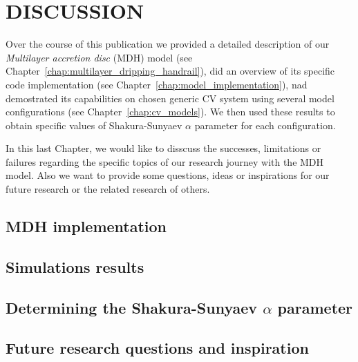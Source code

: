 \chapter{DISCUSSION}
\thispagestyle{empty}


    Over the course of this publication we provided a detailed description of our \emph{Multilayer accretion disc} (MDH) model (see Chapter~\ref{chap:multilayer_dripping_handrail}), did an overview of its specific code implementation (see Chapter~\ref{chap:model_implementation}), nad demostrated its capabilities on chosen generic CV system using several model configurations (see Chapter~\ref{chap:cv_models}). We then used these results to obtain specific values of Shakura-Sunyaev $\alpha$ parameter for each configuration. 

    In this last Chapter, we would like to disscuss the successes, limitations or failures regarding the specific topics of our research journey with the MDH model. Also we want to provide some questions, ideas or inspirations for our future research or the related research of others.
    
\section{MDH implementation}

\section{Simulations results}

\section{Determining the Shakura-Sunyaev $\alpha$ parameter}

\section{Future research questions and inspiration}

